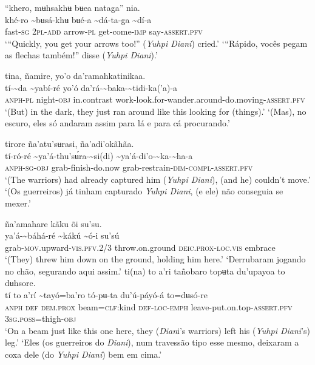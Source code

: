 \documentclass[output=paper,
modfonts,nonflat
]{langsci/langscibook}
\begin{document}
\ea “khero, mʉhsakhʉ bʉea nataga” nia. \\[.3em]
\gll khé-ro	{\textasciitilde}bʉsá-khʉ	bʉé-a	{\textasciitilde}dá-ta-ga	{\textasciitilde}dí-a \\
     fast\textsc{-sg}	2\textsc{pl-add}	arrow\textsc{-pl}	get-come-\textsc{imp}	say-\textsc{assert.pfv}\\
\glt ‘“Quickly, you get your arrows too!” (\textit{Yuhpi Diani}) cried.’
\glt ‘“Rápido, vocês pegam as flechas também!” disse (\textit{Yuhpi Diani}).’
\z 

\ea tina, ñamire, yo'o da'ramahkatinikaa. \\[.3em]
\gll tí-{\textasciitilde}da	{\textasciitilde}yabí-ré	yo'ó	da'rá-{\textasciitilde}baka-{\textasciitilde}tidi-ka('a)-a \\
     \textsc{anph-pl}	night\textsc{-obj}	in.contrast	work-look.for-wander.around-do.moving-\textsc{assert.pfv}\\
\glt ‘(But) in the dark, they just ran around like this looking for (things).’
\glt ‘(Mas), no escuro, eles só andaram assim para lá e para cá procurando.’
\z

 
\ea tirore ña'atu'sʉrasi, ña'adi'okãhãa. \\[.3em]
\gll tí-ró-ré	{\textasciitilde}ya'á-thu'sʉ́ra-{\textasciitilde}si(di)	{\textasciitilde}ya'á-di'o-{\textasciitilde}ka-{\textasciitilde}ha-a \\
     \textsc{anph-sg-obj}	grab-finish-do.now	grab-restrain-\textsc{dim-compl-assert.pfv}\\
\newpage    
\glt ‘(The warriors) had already captured him (\textit{Yuhpi Diani}), (and he) couldn't move.’
\glt ‘(Os guerreiros) já tinham capturado \textit{Yuhpi Diani}, (e ele) não conseguia se mexer.’
\z 

\ea ña'amahare kãku õi su'su. \\[.3em]
\gll {\textasciitilde}ya'á-{\textasciitilde}báhá-ré	{\textasciitilde}kákú	{\textasciitilde}ó-i	su'sú \\
     grab-\textsc{mov}.upward-\textsc{vis.pfv.}2/3	throw.on.ground	\textsc{deic.prox-loc.vis}	embrace\\
\glt ‘(They) threw him down on the ground, holding him here.’
\glt ‘Derrubaram jogando no chão, segurando aqui assim.’
\z 
\ea ti(na) to a’ri tañobaro topʉta du'upayoa to dʉhsore. \\[.3em]
\gll tí	to	a’rí	{\textasciitilde}tayó=ba'ro	tó-pʉ-ta	du'ú-páyó-á	to=dʉsó-re \\
     \textsc{anph}	\textsc{def}	\textsc{dem.prox}	beam=\textsc{clf:}kind	\textsc{def-loc-emph}	leave-put.on.top-\textsc{assert.pfv}	3\textsc{sg.poss}=thigh\textsc{-obj}\\
\glt ‘On a beam just like this one here, they (\textit{Dian}i's warriors) left his (\textit{Yuhpi Diani}'s) leg.’
\glt ‘Eles (os guerreiros do \textit{Diani}), num travessão tipo esse mesmo, deixaram a coxa dele (do \textit{Yuhpi Diani}) bem em cima.’
\z 
\end{document}
